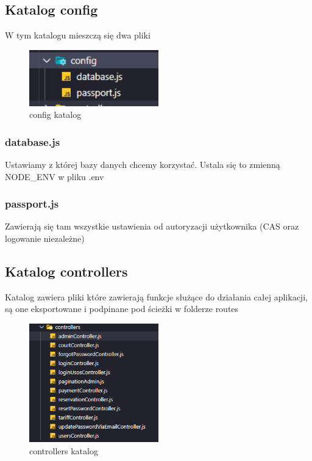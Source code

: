 \documentclass[titlepage]{article}
\begin{document}
\subsection{Katalog config}
W tym katalogu mieszczą się dwa pliki
\begin{figure}[h]
\centering
\includegraphics[width=0.5\textwidth]{config.png}
\caption{config katalog}
\label{fig:obrazek config}
\end{figure}
\subsubsection{database.js}
Ustawiamy z której bazy danych chcemy korzystać. Ustala się to zmienną NODE\_ENV w pliku .env
\subsubsection{passport.js}
Zawierają się tam wszystkie ustawienia od autoryzacji użytkownika (CAS oraz logowanie niezależne)

\subsection{Katalog controllers}
Katalog zawiera pliki które zawierają funkcje służące do działania całej aplikacji, są one eksportowane i podpinane pod ścieżki w folderze routes

\begin{figure}[h]
\centering
\includegraphics[width=0.5\textwidth]{controllers.png}
\caption{controllers katalog}
\label{fig:obrazek controllers}
\end{figure}
\end{document}

